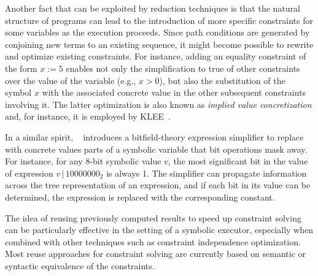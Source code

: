 Another fact that can be exploited by reduction techniques is that the natural structure of programs can lead to the introduction of more specific constraints for some variables as the execution proceeds. Since path conditions are generated by conjoining new terms to an existing sequence, it might become possible to rewrite and optimize existing constraints. For instance, adding an equality constraint of the form $x:=5$ enables not only the simplification to true of other constraints over the value of the variable (e.g., $x>0$), but also the substitution of the symbol $x$ with the associated concrete value in the other subsequent constraints involving it. The latter optimization is also known as {\em implied value concretization} and, for instance, it is employed by {\sc KLEE}~\cite{KLEE-OSDI08}.

In a similar spirit, {\sc \stwoe}~\cite{CKC-TOCS12} introduces a bitfield-theory expression simplifier to replace with concrete values parts of a symbolic variable that bit operations mask away. For instance, for any 8-bit symbolic value $v$, the most significant bit in the value of expression $v\,|\,10000000_2$ is always 1. The simplifier can propagate information across the tree representation of an expression, and if each bit in its value can be determined, the expression is replaced with the corresponding constant.
 



The idea of reusing previously computed results to speed up constraint solving can be particularly effective in the setting of a symbolic executor, especially when combined with other techniques such as constraint independence optimization. Most reuse approaches for constraint solving are currently based on semantic or syntactic equivalence of the constraints.

